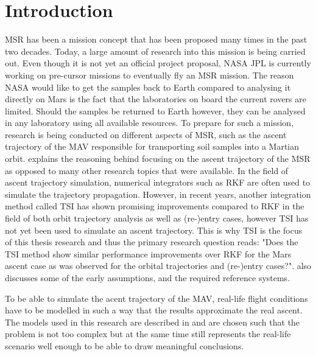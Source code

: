 \chapter{Introduction}  
\label{ch:intro}
\acf{MSR} has been a mission concept that has been proposed many times in the past two decades. Today, a large amount of research into this mission is being carried out. Even though it is not yet an official project proposal, \acf{NASA} \acf{JPL} is currently working on pre-cursor missions to eventually fly an \ac{MSR} mission. The reason \ac{NASA} would like to get the samples back to Earth compared to analysing it directly on Mars is the fact that the laboratories on board the current rovers are limited. Should the samples be returned to Earth however, they can be analysed in any laboratory using all available resources.  To prepare for such a mission, research is being conducted on different aspects of \ac{MSR}, such as the ascent trajectory of the \acf{MAV} responsible for transporting soil samples into a Martian orbit.  explains the reasoning behind focusing on the ascent trajectory of the \ac{MSR} as opposed to many other research topics that were available. In the field of ascent trajectory simulation, numerical integrators such as \acf{RKF} are often used to simulate the trajectory propagation. However, in recent years, another integration method called \acf{TSI} has shown promising improvements compared to \ac{RKF} in the field of both orbit trajectory analysis as well as (re-)entry cases, however \ac{TSI} has not yet been used to simulate an ascent trajectory. This is why \ac{TSI} is the focus of this thesis research and thus the primary research question reads: "Does the \ac{TSI} method show similar performance improvements over \ac{RKF} for the Mars ascent case as was observed for the orbital trajectories and (re-)entry cases?".  also discusses some of the early assumptions, and the required reference systems.

To be able to simulate the acent trajectory of the \ac{MAV}, real-life flight conditions have to be modelled in such a way that the results approximate the real ascent. The models used in this research are described in  and are chosen such that the problem is not too complex but at the same time still represents the real-life scenario well enough to be able to draw meaningful conclusions.

